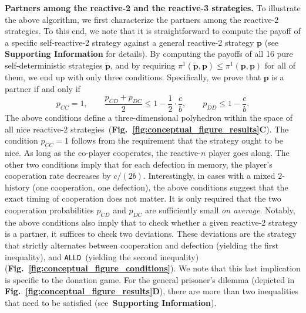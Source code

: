 \documentclass[9pt,twocolumn,twoside]{pnas-new}
\newcommand{\figref}[1]{{\textbf{Fig.~\ref{#1}}}}
\def\alld{\texttt{ALLD}}
\def\SI{\textbf{Supporting Information}}
\begin{document}
\noindent
\textbf{Partners among the reactive-2 and the reactive-3 strategies.}
To illustrate the above algorithm, we first characterize the partners among the reactive-$2$ strategies. 
To this end, we note that it is straightforward to compute the payoff of a specific self-reactive-2 strategy against a general reactive-2 strategy $\mathbf{p}$ (see \SI{} for details). 
By computing the payoffs of all 16 pure self-deterministic strategies $\mathbf{\tilde p}$, and by requiring $\pi^1(\mathbf{\tilde p},\mathbf{p}) \!\le\! \pi^1(\mathbf{p},\mathbf{p})$ for all of them, we end up with only three conditions. Specifically, we prove that $\mathbf{p}$ is a partner if and only if
\begin{equation}\label{eq:two_bit_conditions}
p_{CC} = 1, \qquad  \frac{p_{CD} + p_{DC}}{2} \le 1 - \frac{1}{2} \!\cdot\! \frac{c}{b}, \qquad  p_{DD} \leq 1\!-\! \frac{c}{b}.
\end{equation}
The above conditions define a three-dimensional polyhedron within the space of all nice reactive-2 strategies~(\figref{fig:conceptual_figure_results}\textbf{C}).
The condition $p_{CC}\!=\!1$ follows from the requirement that the strategy ought to be nice. 
As long as the co-player cooperates, the reactive-$n$ player goes along. 
The other two conditions imply that for each defection in memory, the player's cooperation rate decreases by $c/(2b)$.
Interestingly, in cases with a mixed $2$-history (one cooperation, one defection), the above conditions suggest that the exact timing of cooperation does not matter. 
It is only required that the two cooperation probabilities $p_{CD}$ and $p_{DC}$ are sufficiently small {\it on average}. 
Notably, the above conditions also imply that to check whether a given reactive-2 strategy is a partner, it suffices to check two deviations. 
These deviations are the strategy that strictly alternates between cooperation and defection (yielding the first inequality), and \alld~(yielding the second inequality) (\figref{fig:conceptual_figure_conditions}). 
We note that this last implication is specific to the donation game. 
For the general prisoner's dilemma (depicted in \figref{fig:conceptual_figure_results}\textbf{D}), there are more than two inequalities that need to be satisfied (see~\SI{}).
\end{document}
